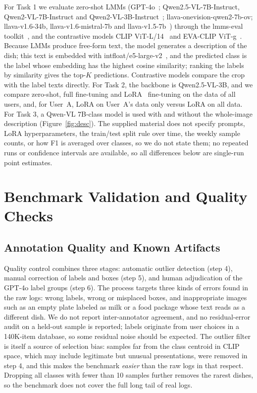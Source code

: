 \documentclass[sigconf, nonacm]{acmart}
\begin{document}
For Task 1 we evaluate zero-shot LMMs (GPT-4o~\cite{achiam2023gpt}; Qwen2.5-VL-7B-Instruct, Qwen2-VL-7B-Instruct and Qwen2-VL-3B-Instruct~\cite{bai2023qwen}; llava-onevision-qwen2-7b-ov; llava-v1.6-34b, llava-v1.6-mistral-7b and llava-v1.5-7b~\cite{liu2024visual, liu2024improved}) through the lmms-eval toolkit~\cite{lmms_eval2024}, and the contrastive models CLIP ViT-L/14~\cite{CLIP} and EVA-CLIP ViT-g~\cite{sun2023eva}. Because LMMs produce free-form text, the model generates a description of the dish; this text is embedded with intfloat/e5-large-v2~\cite{wang2023e5}, and the predicted class is the label whose embedding has the highest cosine similarity; ranking the labels by similarity gives the top-$K$ predictions. Contrastive models compare the crop with the label texts directly. For Task 2, the backbone is Qwen2.5-VL-3B, and we compare zero-shot, full fine-tuning and LoRA~\cite{hu2022lora} fine-tuning on the data of all users, and, for User~A, LoRA on User~A's data only versus LoRA on all data. For Task 3, a Qwen-VL 7B-class model is used with and without the whole-image description (Figure~\ref{fig:desc}). The supplied material does not specify prompts, LoRA hyperparameters, the train/test split rule over time, the weekly sample counts, or how F1 is averaged over classes, so we do not state them; no repeated runs or confidence intervals are available, so all differences below are single-run point estimates.

\section{Benchmark Validation and Quality Checks}
\label{sec:validation}

\subsection{Annotation Quality and Known Artifacts}

Quality control combines three stages: automatic outlier detection (step 4), manual correction of labels and boxes (step 5), and human adjudication of the GPT-4o label groups (step 6). The process targets three kinds of errors found in the raw logs: wrong labels, wrong or misplaced boxes, and inappropriate images such as an empty plate labeled as milk or a food package whose text reads as a different dish. We do not report inter-annotator agreement, and no residual-error audit on a held-out sample is reported; labels originate from user choices in a 140K-item database, so some residual noise should be expected. The outlier filter is itself a source of selection bias: samples far from the class centroid in CLIP space, which may include legitimate but unusual presentations, were removed in step 4, and this makes the benchmark \emph{easier} than the raw logs in that respect. Dropping all classes with fewer than 10 samples further removes the rarest dishes, so the benchmark does not cover the full long tail of real logs.
\end{document}
